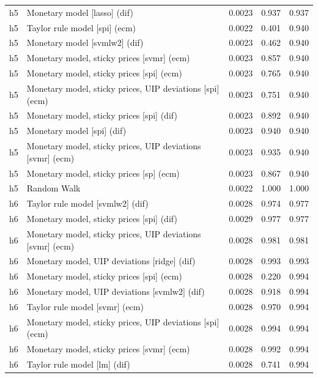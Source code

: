 \begin{ThreePartTable}
\begin{longtable}[t]{cp{5.5cm}ccc}
\addlinespace
h5 & \raggedright Monetary model [lasso] (dif) & 0.0023 & 0.937 & 0.937\\
h5 & \raggedright Taylor rule model [spi] (ecm) & 0.0022 & 0.401 & 0.940\\
h5 & \raggedright Monetary model [svmlw2] (dif) & 0.0023 & 0.462 & 0.940\\
h5 & \raggedright Monetary model, sticky prices [svmr] (ecm) & 0.0023 & 0.857 & 0.940\\
h5 & \raggedright Monetary model, sticky prices [spi] (ecm) & 0.0023 & 0.765 & 0.940\\
h5 & \raggedright Monetary model, sticky prices, UIP deviations [spi] (ecm) & 0.0023 & 0.751 & 0.940\\
h5 & \raggedright Monetary model, sticky prices [spi] (dif) & 0.0023 & 0.892 & 0.940\\
h5 & \raggedright Monetary model [spi] (dif) & 0.0023 & 0.940 & 0.940\\
h5 & \raggedright Monetary model, sticky prices, UIP deviations [svmr] (ecm) & 0.0023 & 0.935 & 0.940\\
h5 & \raggedright Monetary model, sticky prices [sp] (ecm) & 0.0023 & 0.867 & 0.940\\
h5 & \raggedright Random Walk & 0.0022 & 1.000 & 1.000\\
\addlinespace
h6 & \raggedright Taylor rule model [svmlw2] (dif) & 0.0028 & 0.974 & 0.977\\
h6 & \raggedright Monetary model, sticky prices [spi] (dif) & 0.0029 & 0.977 & 0.977\\
h6 & \raggedright Monetary model, sticky prices, UIP deviations [svmr] (ecm) & 0.0028 & 0.981 & 0.981\\
h6 & \raggedright Monetary model, UIP deviations [ridge] (dif) & 0.0028 & 0.993 & 0.993\\
h6 & \raggedright Monetary model, sticky prices [spi] (ecm) & 0.0028 & 0.220 & 0.994\\
h6 & \raggedright Monetary model, UIP deviations [svmlw2] (dif) & 0.0028 & 0.918 & 0.994\\
h6 & \raggedright Taylor rule model [svmr] (ecm) & 0.0028 & 0.970 & 0.994\\
h6 & \raggedright Monetary model, sticky prices, UIP deviations [spi] (ecm) & 0.0028 & 0.994 & 0.994\\
h6 & \raggedright Monetary model, sticky prices [svmr] (ecm) & 0.0028 & 0.992 & 0.994\\
h6 & \raggedright Taylor rule model [lm] (dif) & 0.0028 & 0.741 & 0.994\\

\end{longtable}
\end{ThreePartTable}
